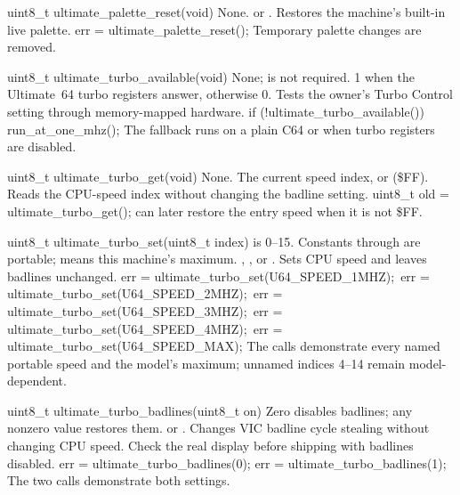 \begin{referencechapter}
{uint8\_t ultimate\_palette\_reset(void)}
{None.}
{ or .}
{Restores the machine's built-in live palette.}
{err = ultimate\_palette\_reset();}
{Temporary palette changes are removed.}

{uint8\_t ultimate\_turbo\_available(void)}
{None;  is not required.}
{1 when the Ultimate~64 turbo registers answer, otherwise 0.}
{Tests the owner's Turbo Control setting through memory-mapped hardware.}
{if (!ultimate\_turbo\_available()) run\_at\_one\_mhz();}
{The fallback runs on a plain C64 or when turbo registers are disabled.}

{uint8\_t ultimate\_turbo\_get(void)}
{None.}
{The current speed index, or  (\$FF).}
{Reads the CPU-speed index without changing the badline setting.}
{uint8\_t old = ultimate\_turbo\_get();}
{ can later restore the entry speed when it is not \$FF.}

{uint8\_t ultimate\_turbo\_set(uint8\_t index)}
{ is 0--15. Constants through  are portable;
 means this machine's maximum.}
{, , or
.}
{Sets CPU speed and leaves badlines unchanged.}
{err = ultimate\_turbo\_set(U64\_SPEED\_1MHZ);\
err = ultimate\_turbo\_set(U64\_SPEED\_2MHZ);\
err = ultimate\_turbo\_set(U64\_SPEED\_3MHZ);\
err = ultimate\_turbo\_set(U64\_SPEED\_4MHZ);\
err = ultimate\_turbo\_set(U64\_SPEED\_MAX);}
{The calls demonstrate every named portable speed and the model's maximum;
unnamed indices 4--14 remain model-dependent.}

{uint8\_t ultimate\_turbo\_badlines(uint8\_t on)}
{Zero disables badlines; any nonzero value restores them.}
{ or .}
{Changes VIC badline cycle stealing without changing CPU speed. Check the real
display before shipping with badlines disabled.}
{err = ultimate\_turbo\_badlines(0); err = ultimate\_turbo\_badlines(1);}
{The two calls demonstrate both settings.}


\end{referencechapter}
